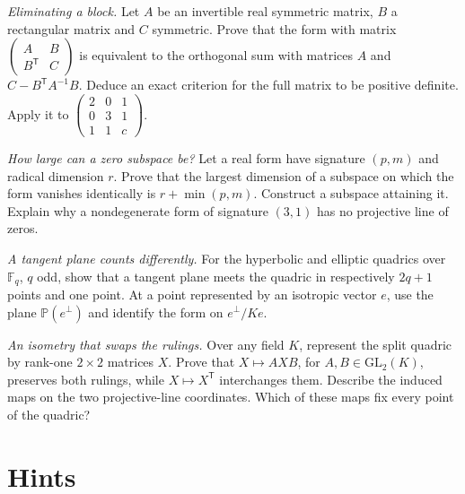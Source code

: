 \begin{exercise}[$\star\star$]\label{geometry:ex:v9-schur-complement}
\emph{Eliminating a block.} Let $A$ be an invertible real symmetric matrix,
$B$ a rectangular matrix and $C$ symmetric. Prove that the form with matrix
$\left(\begin{smallmatrix}A&B\\B^{\mathsf T}&C\end{smallmatrix}\right)$
is equivalent to the orthogonal sum with matrices $A$ and
$C-B^{\mathsf T}A^{-1}B$. Deduce an exact criterion for the full matrix
to be positive definite. Apply it to
$\left(\begin{smallmatrix}2&0&1\\0&3&1\\1&1&c\end{smallmatrix}\right)$.
\end{exercise}
\begin{exercise}[$\star\star$]\label{geometry:ex:v9-maximal-isotropic}
\emph{How large can a zero subspace be?} Let a real form have signature
$(p,m)$ and radical dimension $r$. Prove that the largest dimension of
a subspace on which the form vanishes identically is $r+\min(p,m)$.
Construct a subspace attaining it. Explain why a nondegenerate form of
signature $(3,1)$ has no projective line of zeros.
\end{exercise}
\begin{exercise}[$\star\star$]\label{geometry:ex:v9-finite-tangent-plane}
\emph{A tangent plane counts differently.} For the hyperbolic and elliptic
quadrics over $\mathbb F_q$, $q$ odd, show that a tangent plane meets the
quadric in respectively $2q+1$ points and one point. At a point represented
by an isotropic vector $e$, use the plane $\mathbb P(e^\perp)$ and identify
the form on $e^\perp/Ke$.
\end{exercise}
\begin{exercise}[$\star\star$]\label{geometry:ex:v9-rulings-under-map}
\emph{An isometry that swaps the rulings.} Over any field $K$, represent the split quadric by
rank-one $2\times2$ matrices $X$. Prove that $X\mapsto AXB$, for
$A,B\in\mathrm{GL}_2(K)$, preserves both rulings, while $X\mapsto X^{\mathsf T}$
interchanges them. Describe the induced maps on the two projective-line
coordinates. Which of these maps fix every point of the quadric?
\end{exercise}

\section{Hints}

